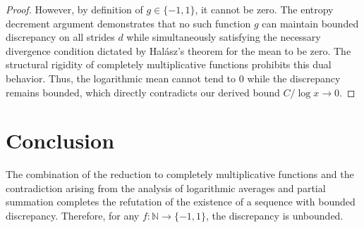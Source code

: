 \documentclass[12pt]{article}
\begin{document}
\begin{proof}
However, by definition of $g \in \{-1, 1\}$, it cannot be zero. The entropy decrement argument demonstrates that no such function $g$ can maintain bounded discrepancy on all strides $d$ while simultaneously satisfying the necessary divergence condition dictated by Halász's theorem for the mean to be zero. The structural rigidity of completely multiplicative functions prohibits this dual behavior. Thus, the logarithmic mean cannot tend to 0 while the discrepancy remains bounded, which directly contradicts our derived bound $C / \log x \to 0$.
\end{proof}

\section{Conclusion}

The combination of the reduction to completely multiplicative functions and the contradiction arising from the analysis of logarithmic averages and partial summation completes the refutation of the existence of a sequence with bounded discrepancy. Therefore, for any $f : \mathbb{N} \to \{-1, 1\}$, the discrepancy is unbounded.
\end{document}
